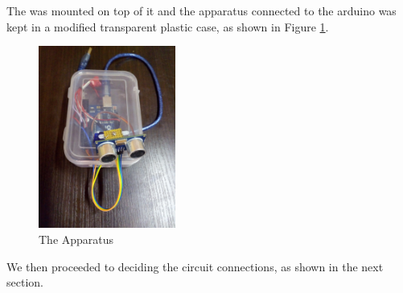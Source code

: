 The \ultrasonic{} was mounted on top of it and the apparatus connected to the arduino was kept in a modified transparent plastic case, as shown in Figure \ref{fig:projphoto}.
\begin{figure}[H]
	\centering
	\includegraphics[width=0.4\textwidth]{../Files/proj.jpg}
	\caption{The Apparatus}  \label{fig:projphoto}
\end{figure}
We then proceeded to deciding the circuit connections, as shown in the next section.
\clearpage
